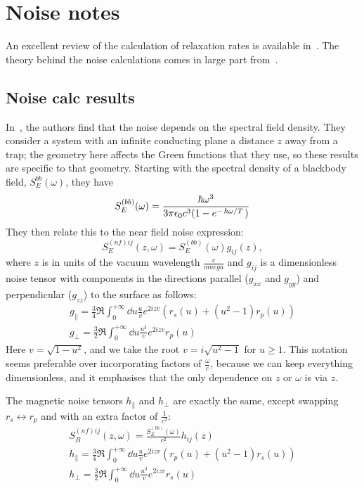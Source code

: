 \documentclass[11pt]{article}
\begin{document}
	\graphicspath{{figures/}}

	\section{Noise notes} \label{sec:NoiseCalc}
	An excellent review of the calculation of relaxation rates is available in~\cite{Henkel1999}.
	The theory behind the noise calculations comes in large part from~\cite{Agarwal1975}.

	\subsection{Noise calc results} \label{subsec:NoiseCalcResults}
	In~\cite{Henkel1999}, the authors find that the noise depends on the spectral field density.
	They consider a system with an infinite conducting plane a distance $z$ away from a trap;
	the geometry here affects the Green functions that they use, so these results are specific to that geometry.
	Starting with the spectral density of a blackbody field, $S^{bb}_E(\omega)$, they have
	\begin{equation}
		S^{(bb)}_E(\omega) = \frac{\hbar \omega^3}{3 \pi \epsilon_0 c^3 (1 - e^{-\flatfrac{\hbar \omega}{T}})}
	\end{equation}
	They then relate this to the near field noise expression:
	\begin{equation}
		S^{(nf)ij}_E(z, \omega) = S^{(bb)}_E(\omega) g_{ij}(z),
	\end{equation}
	where $z$ is in units of the vacuum wavelength $\frac{c}{omega}$ and $g_{ij}$ is a dimensionless noise tensor with components in the directions parallel ($g_{xx}$ and $g_{yy}$) and perpendicular ($g_{zz}$) to the surface as follows:
	\begin{gather}
		g_\parallel = \frac34 \Re \int_0^{+\infty} \dd{u} \frac{u}{v} e^{2i z v} \left(r_s(u) + \left(u^2 - 1\right) r_p(u) \right) \\
		g_\perp = \frac32 \Re \int_0^{+\infty} \dd{u} \frac{u^3}{v} e^{2 i z v} r_p(u)
	\end{gather}
	Here $v = \sqrt{1 - u^2}$, and we take the root $v = i \sqrt{u^2 - 1}$ for $u \geq 1$.
	This notation seems preferable over incorporating factors of $\frac{\omega}{c}$, because we can keep everything dimensionless, and it emphasises that the only dependence on $z$ or $\omega$ is via $z$.

	The magnetic noise tensors $h_\parallel$ and $h_\perp$ are exactly the same, except swapping $r_s \leftrightarrow r_p$ and with an extra factor of $\frac{1}{c^2}$:
	\begin{gather}
		S^{(nf)ij}_B(z, \omega) = \frac{S^{(bb)}_E(\omega)}{c^2} h_{ij}(z) \\
		h_\parallel = \frac34 \Re \int_0^{+\infty} \dd{u} \frac{u}{v} e^{2i z v} \left(r_p(u) + \left(u^2 - 1\right) r_s(u) \right) \\
		h_\perp = \frac32 \Re \int_0^{+\infty} \dd{u} \frac{u^3}{v} e^{2 i z v} r_s(u)
	\end{gather}
\end{document}
